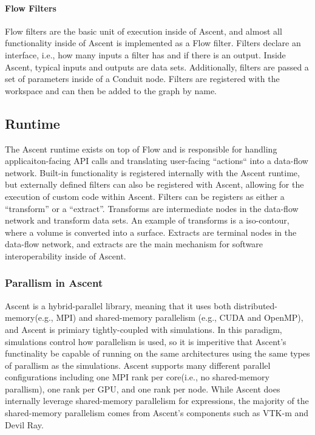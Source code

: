 \paragraph{Flow Filters}
Flow filters are the basic unit of execution inside of Ascent, and
almost all functionality inside of Ascent is implemented as a Flow filter.
%
Filters declare an interface, i.e., how many inputs a filter has and
if there is an output.
%
Inside Ascent, typical inputs and outputs are data sets.
%
Additionally, filters are passed a set of parameters inside of a Conduit
node.
%
Filters are registered with the workspace and can then be added to the
graph by name.


\subsection{Runtime}
The Ascent runtime exists on top of Flow and is responsible for
handling applicaiton-facing API calls and translating user-facing
``actions`` into a data-flow network.
%
Built-in functionality is registered internally with the Ascent runtime,
but externally defined filters can also be registered with Ascent,
allowing for the execution of custom code within Ascent.
%
Filters can be registers as either a ``transform'' or a ``extract''.
%
Transforms are intermediate nodes in the data-flow network and transform
data sets.
%
An example of transforms is a iso-contour, where a volume is converted
into a surface.
%
Extracts are terminal nodes in the data-flow network, and extracts
are the main mechanism for software interoperability inside of Ascent.

\subsubsection{Parallism in Ascent}
Ascent is a hybrid-parallel library, meaning that it uses both
distributed-memory(e.g., MPI) and shared-memory parallelism
(e.g., CUDA and OpenMP), and Ascent is primiary
tightly-coupled with simulations.
%
In this paradigm, simulations control how parallelism is used, so
it is imperitive that Ascent's functinality be capable of running
on the same architectures using the same types of parallism as the
simulations.
%
Ascent supports many different parallel configurations including
one MPI rank per core(i.e., no shared-memory parallism), one rank
per GPU, and one rank per node.
%
While Ascent does internally leverage shared-memory parallelism
for expressions, the majority of the shared-memory parallelism comes
from Ascent's components such as VTK-m and Devil Ray.

